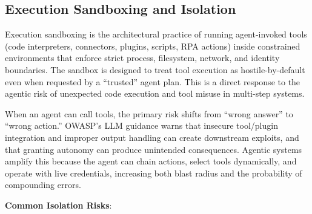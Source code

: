 

\begin{TNtwocol}
    \section{Execution Sandboxing and Isolation}

    Execution sandboxing is the architectural practice of running agent-invoked tools (code interpreters, connectors, plugins, scripts, RPA actions) inside constrained environments that enforce strict process, filesystem, network, and identity boundaries. The sandbox is designed to treat tool execution as hostile-by-default even when requested by a “trusted” agent plan. This is a direct response to the agentic risk of unexpected code execution and tool misuse in multi-step systems.

    When an agent can call tools, the primary risk shifts from “wrong answer” to “wrong action.” OWASP's LLM guidance warns that insecure tool/plugin integration and improper output handling can create downstream exploits, and that granting autonomy can produce unintended consequences.  Agentic systems amplify this because the agent can chain actions, select tools dynamically, and operate with live credentials, increasing both blast radius and the probability of compounding errors.

    \textbf{Common Isolation Risks}:


\end{TNtwocol}
